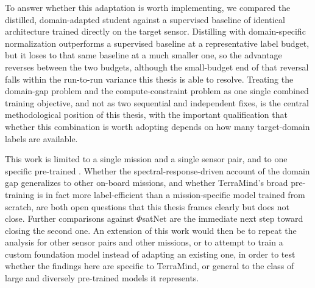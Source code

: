 To answer whether this adaptation is worth implementing, we compared the distilled, domain-adapted student against a supervised baseline of identical architecture trained directly on the target sensor.
Distilling with domain-specific normalization outperforms a supervised baseline at a representative label budget, but it loses to that same baseline at a much smaller one, so the advantage reverses between the two budgets, although the small-budget end of that reversal falls within the run-to-run variance this thesis is able to resolve.
Treating the domain-gap problem and the compute-constraint problem as one single combined training objective, and not as two sequential and independent fixes, is the central methodological position of this thesis, with the important qualification that whether this combination is worth adopting depends on how many target-domain labels are available.

This work is limited to a single mission and a single sensor pair, and to one specific pre-trained .
Whether the spectral-response-driven account of the domain gap generalizes to other on-board missions, and whether TerraMind's broad pre-training is in fact more label-efficient than a mission-specific model trained from scratch, are both open questions that this thesis frames clearly but does not close.
Further comparisons against $\Phi$satNet are the immediate next step toward closing the second one.
An extension of this work would then be to repeat the analysis for other sensor pairs and other missions, or to attempt to train a custom foundation model instead of adapting an existing one, in order to test whether the findings here are specific to TerraMind, or general to the class of large and diversely pre-trained  models it represents.
